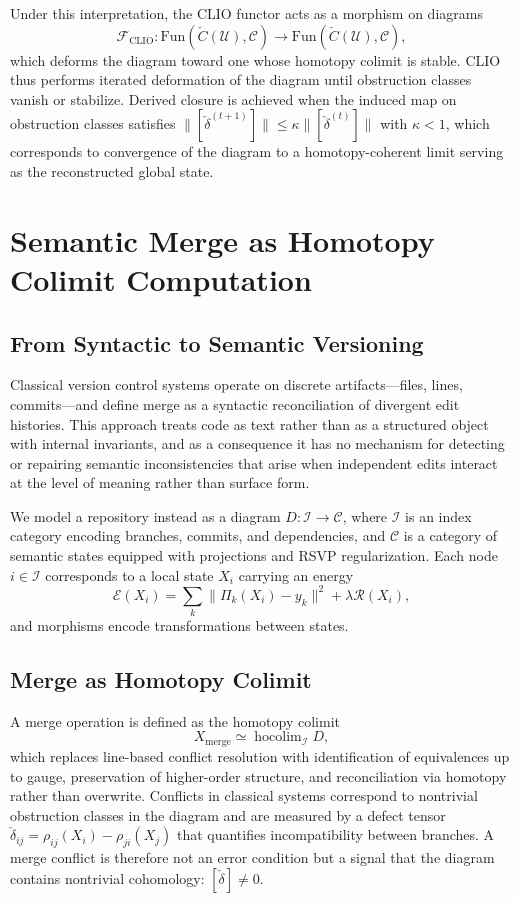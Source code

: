 \documentclass[12pt, oneside]{article}
\begin{document}
Under this interpretation, the CLIO functor \cite{cheng2025clio} acts as a morphism on diagrams
\[
\mathcal{F}_{\mathrm{CLIO}} : \mathrm{Fun}(\check{C}(\mathcal{U}), \mathcal{C}) \to \mathrm{Fun}(\check{C}(\mathcal{U}), \mathcal{C}),
\]
which deforms the diagram toward one whose homotopy colimit is stable. CLIO thus performs iterated deformation of the diagram until obstruction classes vanish or stabilize. Derived closure is achieved when the induced map on obstruction classes satisfies $\|[\check{\delta}^{(t+1)}]\| \leq \kappa \|[\check{\delta}^{(t)}]\|$ with $\kappa < 1$, which corresponds to convergence of the diagram to a homotopy-coherent limit serving as the reconstructed global state.

\section{Semantic Merge as Homotopy Colimit Computation}

\subsection{From Syntactic to Semantic Versioning}

Classical version control systems operate on discrete artifacts---files, lines, commits---and define merge as a syntactic reconciliation of divergent edit histories. This approach treats code as text rather than as a structured object with internal invariants, and as a consequence it has no mechanism for detecting or repairing semantic inconsistencies that arise when independent edits interact at the level of meaning rather than surface form.

We model a repository instead as a diagram $D : \mathcal{I} \to \mathcal{C}$, where $\mathcal{I}$ is an index category encoding branches, commits, and dependencies, and $\mathcal{C}$ is a category of semantic states equipped with projections and RSVP regularization. Each node $i \in \mathcal{I}$ corresponds to a local state $X_i$ carrying an energy
\[
\mathcal{E}(X_i) = \sum_k \|\Pi_k(X_i) - y_k\|^2 + \lambda \mathcal{R}(X_i),
\]
and morphisms encode transformations between states.

\subsection{Merge as Homotopy Colimit}

A merge operation is defined as the homotopy colimit
\[
X_{\mathrm{merge}} \simeq \operatorname{hocolim}_{\mathcal{I}} D,
\]
which replaces line-based conflict resolution with identification of equivalences up to gauge, preservation of higher-order structure, and reconciliation via homotopy rather than overwrite. Conflicts in classical systems correspond to nontrivial obstruction classes in the diagram and are measured by a defect tensor $\check{\delta}_{ij} = \rho_{ij}(X_i) - \rho_{ji}(X_j)$ that quantifies incompatibility between branches. A merge conflict is therefore not an error condition but a signal that the diagram contains nontrivial cohomology: $[\check{\delta}] \neq 0$.
\end{document}
